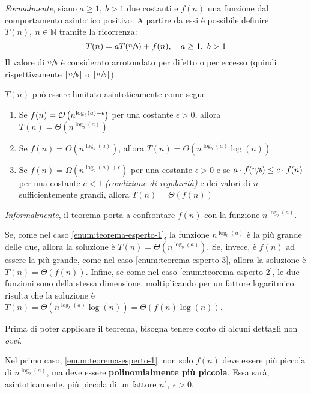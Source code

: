 \documentclass[italian, 10pt]{article}
\begin{document}
\bigskip
\textit{Formalmente}, siano \(a \geq 1,\ b > 1\) due costanti e \(f(n)\) una funzione dal comportamento asintotico positivo.
A partire da essi è possibile definire \(T(n),\ n \in \mathbb{N}\) tramite la ricorrenza:
\[ T(n) = aT(\sfrac{n}{b}) + f(n) , \quad a \geq 1,\ b > 1 \]
Il valore di \(\sfrac{n}{b}\) è considerato arrotondato per difetto o per eccesso (quindi rispettivamente \(\lfloor\sfrac{n}{b}\rfloor\) o \(\lceil\sfrac{n}{b}\rceil\)).

\(T(n)\) può essere limitato asintoticamente come segue:

\begin{enumerate}[label=\arabic*), ref=(\arabic*)]
  \item\label{enum:teorema-esperto-1} Se \(f(n) = \mathcal{O}\left(n^{\log_b(a) - \epsilon}\right)\) per una costante \(\epsilon > 0\), allora \(T(n) = \Theta\left(n^{\log_b (a)}\right)\)
  \item\label{enum:teorema-esperto-2} Se \(f(n) = \Theta\left(n^{\log_b(a)}\right)\), allora \(T(n) = \Theta\left(n^{\log_b(a)} \log{(n)}\right)\)
  \item\label{enum:teorema-esperto-3} Se \(f(n) = \Omega\left(n^{\log_b(a) + \epsilon}\right)\) per una costante \(\epsilon > 0\) e se \(a \cdot f(\sfrac{n}{b}) \leq c \cdot f(n)\) per una costante \(c < 1\) \textit{(condizione di regolarità)} e dei valori di \(n\) sufficientemente grandi, allora \(T(n) = \Theta\left(f(n)\right)\)
\end{enumerate}

\bigskip
\textit{Informalmente}, il teorema porta a confrontare \(f(n)\) con la funzione \(n^{\log_b(a)}\).

Se, come nel caso \ref{enum:teorema-esperto-1}, la funzione \(n^{\log_b(a)}\) è la più grande delle due, allora la soluzione è \(T(n) = \Theta\left(n^{\log_b (a)}\right)\).
Se, invece, è \(f(n)\) ad essere la più grande, come nel caso \ref{enum:teorema-esperto-3}, allora la soluzione è \(T(n) = \Theta\left(f(n)\right)\).
Infine, se come nel caso \ref{enum:teorema-esperto-2}, le due funzioni sono della stessa dimensione, moltiplicando per un fattore logaritmico risulta che la soluzione è \(T(n) = \Theta\left(n^{\log_b(a)} \log{(n)}\right) = \Theta\left(f(n) \log{(n)}\right)\).

\bigskip
Prima di poter applicare il teorema, bisogna tenere conto di alcuni dettagli non \textit{ovvi}.

Nel primo caso, \ref{enum:teorema-esperto-1}, non solo \(f(n)\) deve essere più piccola di \(n^{\log_b(a)}\), ma deve essere \textbf{polinomialmente più piccola}.
Essa sarà, asintoticamente, più piccola di un fattore \(n^\epsilon,\ \epsilon>0\).
\end{document}
